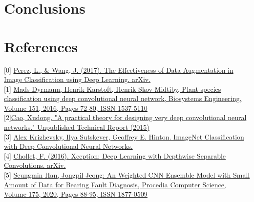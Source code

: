 \documentclass[11pt, oneside]{article}
\begin{document}
\section{Conclusions}

\section*{References}
[0] \href{https://doi.org/10.48550/arXiv.1712.04621}{Perez, L., \& Wang, J. (2017). The Effectiveness of Data Augmentation in Image Classification using Deep Learning. arXiv.}\\
{[1]} \href{https://doi.org/10.1016/j.biosystemseng.2016.08.024}{Mads Dyrmann, Henrik Karstoft, Henrik Skov Midtiby, Plant species classification using deep convolutional neural network, Biosystems Engineering, Volume 151, 2016, Pages 72-80, ISSN 1537-5110} \\
{[2]}\href{https://www.kaggle.com/blobs/download/forum-message-attachment-files/2287/A%20practical%20theory%20for%20designing%20very%20deep%20convolutional%20neural%20networks.pdf}{Cao, Xudong. "A practical theory for designing very deep convolutional neural networks." Unpublished Technical Report (2015)}\\
{[3]} \href{https://proceedings.neurips.cc/paper/2012/file/c399862d3b9d6b76c8436e924a68c45b-Paper.pdf}{Alex Krizhevsky, Ilya Sutskever, Geoffrey E. Hinton. ImageNet Classification with Deep Convolutional Neural Networks.} \\
{[4]} \href{https://arxiv.org/pdf/1610.02357.pdf}{Chollet, F. (2016). Xception: Deep Learning with Depthwise Separable Convolutions. arXiv. }\\
{[5]} \href{https://doi.org/10.1016/j.procs.2020.07.015}{Seungmin Han, Jongpil Jeong: An Weighted CNN Ensemble Model with Small Amount of Data for Bearing Fault Diagnosis, Procedia Computer Science, Volume 175, 2020, Pages 88-95, ISSN 1877-0509} \\
\end{document}
